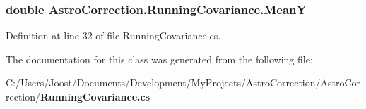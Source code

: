 \subsubsection[{MeanY}]{\setlength{\rightskip}{0pt plus 5cm}double AstroCorrection.RunningCovariance.MeanY\hspace{0.3cm}{\ttfamily  [get, set]}}\label{class_astro_correction_1_1_running_covariance_a6b1908501a842face78b11a3ecc15aba}


Definition at line 32 of file RunningCovariance.cs.

The documentation for this class was generated from the following file:\begin{DoxyCompactItemize}
\item 
C:/Users/Joost/Documents/Development/MyProjects/AstroCorrection/AstroCorrection/{\bf RunningCovariance.cs}\end{DoxyCompactItemize}
